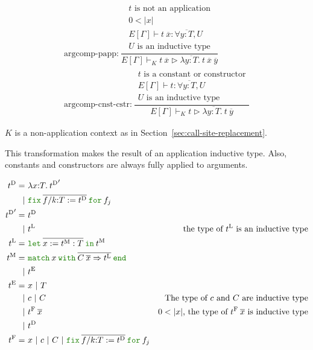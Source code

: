 \documentclass[a4paper,fleqn]{article}
\newcommand{\kwlet}{\mbox{\color{mygreen}\ttfamily let}}
\newcommand{\kwin}{\mbox{\color{mygreen}\ttfamily in}}
\newcommand{\kwmatch}{\mbox{\color{mygreen}\ttfamily match}}
\newcommand{\kwwith}{\mbox{\color{mygreen}\ttfamily with}}
\newcommand{\kwend}{\mbox{\color{mygreen}\ttfamily end}}
\newcommand{\kwfix}{\mbox{\color{mygreen}\ttfamily fix}}
\newcommand{\kwfor}{\mbox{\color{mygreen}\ttfamily for}}
\newcommand{\lam}[2]{\lambda #1.\:#2}
\newcommand{\lamT}[3]{\lambda #1\mathord{:}#2.\:#3}
\newcommand{\letinM}[3]{\kwlet\:\rep{#1:=#2}\:\kwin\:#3}
\newcommand{\omatch}[2]{\kwmatch\:#1\:\kwwith\:{#2}\:\kwend}
\newcommand{\ofix}[2]{\kwfix\:{#1}\:\kwfor\:{#2}}
\newcommand{\tD}{{t^\mathrm{D}}}
\newcommand{\tE}{{t^\mathrm{E}}}
\newcommand{\tL}{{t^\mathrm{L}}}
\newcommand{\tM}{{t^\mathrm{M}}}
\newcommand{\tF}{{t^\mathrm{F}}}
\newcommand{\breakrule}{\\[0.5em]}
\newcommand{\secref}[1]{Section~\ref{#1}}
\newcommand{\reltri}{\mathrel{\triangleright}}
\newcommand{\rep}[1]{\overline{#1}}
\begin{document}
\begin{gather*}
  \text{argcomp-papp:}~
    \dfrac{
      \begin{gathered}
        \text{$t$ is not an application} \\
        0 < |x| \\
        E[\Gamma] \vdash t\:\rep{x} : \forall \rep{y{:}T}, U \\
        \text{$U$ is an inductive type}
      \end{gathered}
    }{E[\Gamma] \vdash_K
        t\:\rep{x}
        \reltri
        \lam{\rep{y{:}T}}{t\:\rep{x}\:\rep{y}}
    } \breakrule
  \text{argcomp-cnst-cstr:}~
    \dfrac{
      \begin{gathered}
        \text{$t$ is a constant or constructor} \\
        E[\Gamma] \vdash t : \forall \rep{y{:}T}, U \\
        \text{$U$ is an inductive type}
      \end{gathered}
    }{E[\Gamma] \vdash_K
        t
        \reltri
        \lam{\rep{y{:}T}}{t\:\rep{y}}
    }
\end{gather*}

$K$ is a non-application context as in \secref{sec:call-site-replacement}.

This transformation makes the result of an application inductive type.
Also, constants and constructors are always fully applied to arguments.

\begin{align*}
  \tD =&\ \lamT{x}{T}{\tD'} \\
      |&\ \ofix{\overline{f/k{:}T:=\tD}}{f_j} \\
  \tD' =&\ \tD \\
       |&\ \tL & \text{the type of $\tL$ is an inductive type} \\
  \tL =&\ \letinM{x}{\tM:T}{\tM} \\
  \tM =&\ \omatch{x}{\overline{C\:\overline{x}\Rightarrow \tL}} \\
      |&\ \tE \\
  \tE =&\ x ~|~ T \\
    |&\ c ~|~ C & \text{The type of $c$ and $C$ are inductive type} \\
    |&\ \tF\:\rep{x} & \text{$0 < |x|$, the type of $\tF\:\rep{x}$ is inductive type}  \\
    |&\ \tD \\
  \tF =&\ x ~|~ c ~|~ C ~|~ \ofix{\overline{f/k{:}T:=\tD}}{f_j}
\end{align*}
\end{document}
